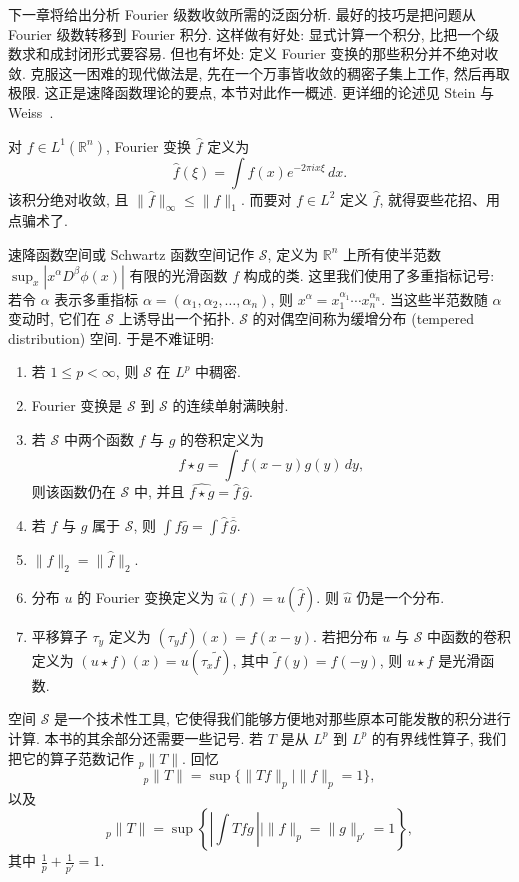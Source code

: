 下一章将给出分析 Fourier 级数收敛所需的泛函分析. 最好的技巧是把问题从 Fourier 级数转移到 Fourier 积分. 这样做有好处: 显式计算一个积分, 比把一个级数求和成封闭形式要容易. 但也有坏处: 定义 Fourier 变换的那些积分并不绝对收敛. 克服这一困难的现代做法是, 先在一个万事皆收敛的稠密子集上工作, 然后再取极限. 这正是速降函数理论的要点, 本节对此作一概述. 更详细的论述见 Stein 与 Weiss~\cite{steinweiss}.

对 $f\in L^1(\mathbb{R}^n)$, Fourier 变换 $\hat{f}$ 定义为
\[
\hat{f}(\xi)=\int f(x)e^{-2\pi ix\xi}\,dx.
\]
该积分绝对收敛, 且 $\|\hat{f}\|_{\infty}\leq\|f\|_1$. 而要对 $f\in L^2$ 定义 $\hat{f}$, 就得耍些花招、用点骗术了.

速降函数空间或 Schwartz 函数空间记作 $\mathcal{S}$, 定义为 $\mathbb{R}^n$ 上所有使半范数 $\sup_x\allowbreak|x^{\alpha}D^{\beta}\phi(x)|$ 有限的光滑函数 $f$ 构成的类. 这里我们使用了多重指标记号: 若令 $\alpha$ 表示多重指标 $\alpha=(\alpha_1,\alpha_2,\ldots,\alpha_n)$, 则 $x^{\alpha}=x_1^{\alpha_1}\cdots x_n^{\alpha_n}$. 当这些半范数随 $\alpha$ 变动时, 它们在 $\mathcal{S}$ 上诱导出一个拓扑. $\mathcal{S}$ 的对偶空间称为缓增分布 (tempered distribution) 空间. 于是不难证明:

\begin{theorem}\label{thm:0.2}
\begin{enumerate}[label=\alph*)]
\item 若 $1\leq p<\infty$, 则 $\mathcal{S}$ 在 $L^p$ 中稠密.
\item Fourier 变换是 $\mathcal{S}$ 到 $\mathcal{S}$ 的连续单射满映射.
\item 若 $\mathcal{S}$ 中两个函数 $f$ 与 $g$ 的卷积定义为
\[
f\star g=\int f(x-y)g(y)\,dy,
\]
则该函数仍在 $\mathcal{S}$ 中, 并且 $\widehat{f\star g}=\hat{f}\,\hat{g}$.
\item 若 $f$ 与 $g$ 属于 $\mathcal{S}$, 则 $\int f\bar{g}=\int\hat{f}\,\overline{\hat{g}}$.
\item $\|f\|_2=\|\hat{f}\|_2$.
\item 分布 $u$ 的 Fourier 变换定义为 $\hat{u}(f)=u(\hat{f})$. 则 $\hat{u}$ 仍是一个分布.
\item 平移算子 $\tau_y$ 定义为 $(\tau_y f)(x)=f(x-y)$. 若把分布 $u$ 与 $\mathcal{S}$ 中函数的卷积定义为 $(u\star f)(x)=u(\tau_x\tilde{f})$, 其中 $\tilde{f}(y)=f(-y)$, 则 $u\star f$ 是光滑函数.
\end{enumerate}
\end{theorem}

空间 $\mathcal{S}$ 是一个技术性工具, 它使得我们能够方便地对那些原本可能发散的积分进行计算. 本书的其余部分还需要一些记号. 若 $T$ 是从 $L^p$ 到 $L^p$ 的有界线性算子, 我们把它的算子范数记作 ${}_p\|T\|$. 回忆
\[
{}_p\|T\|=\sup\{\|Tf\|_p \mid \|f\|_p=1\},
\]
以及
\[
{}_p\|T\|=\sup\left\{\left|\int Tfg\,\right| \mid \|f\|_p=\|g\|_{p'}=1\right\},
\]
其中 $\frac{1}{p}+\frac{1}{p'}=1$.

